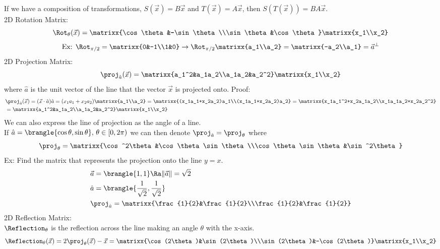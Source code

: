 If we have a composition of transformations, $S(\vec{x})=B\vec{x}$ and $T(\vec{x})=A\vec{x}$, then $S(T(\vec{x}))=BA\vec{x}$.\\
2D Rotation Matrix:
$$\Rot_{\theta}(\vec{x})=\matrixx{\cos\theta&-\sin\theta\\\sin\theta&\cos\theta}\matrixx{x_1\\x_2}\\$$
\begin{align*}
    \text{Ex: }\Rot_{\pi/2}=\matrixx{0&-1\\1&0}\to\Rot_{\pi/2}\matrixx{a_1\\a_2}=\matrixx{-a_2\\a_1}=\vec{a}^\perp
\end{align*}
2D Projection Matrix:
$$\proj_{\hat{a}}(\vec{x})=\matrixx{a_1^2&a_1a_2\\a_1a_2&a_2^2}\matrixx{x_1\\x_2}$$
where $\hat{a}$ is the unit vector of the line that the vector $\vec{x}$ is projected onto.
Proof:
\begin{align*}
    &\proj_{\hat{a}}(\vec{x})=(\vec{x}\cdot\hat{a})\hat{a}=(x_1a_1+x_2a_2)\matrixx{a_1\\a_2}=\matrixx{(x_1a_1+x_2a_2)a_1\\(x_1a_1+x_2a_2)a_2}=\matrixx{x_1a_1^2+x_2a_1a_2\\x_1a_1a_2+x_2a_2^2}\\
    &=\matrixx{a_1^2&a_1a_2\\a_1a_2&a_2^2}\matrixx{x_1\\x_2}
\end{align*}
We can also express the line of projection as the angle of a line.\\
If $\hat{a}=\brangle{\cos\theta,\sin\theta},\,\theta\in[0,2\pi)$ we can then denote $\proj_{\hat{a}}=\proj_\theta$ where
$$\proj_\theta=\matrixx{\cos^2\theta&\cos\theta\sin\theta\\\cos\theta\sin\theta&\sin^2\theta}$$
Ex: Find the matrix that represents the projection onto the line $y=x$.
\begin{align*}
    &\vec{a}=\brangle{1,1}\Ra \|\vec{a}\|=\sqrt{2}\\
    &\hat{a}=\brangle{\frac{1}{\sqrt{2}},\frac{1}{\sqrt{2}}}\\
    &\proj_{\hat{a}}=\matrixx{\frac{1}{2}&\frac{1}{2}\\\frac{1}{2}&\frac{1}{2}}
\end{align*}
2D Reflection Matrix:\\
$\Reflection_{\theta}$ is the reflection across the line making an angle $\theta$ with the x-axis.
$$\Reflection_\theta(\vec{x})=2\proj_{\theta}(\vec{x})-\vec{x}=\matrixx{\cos(2\theta)&\sin(2\theta)\\\sin(2\theta)&-\cos(2\theta)}\matrixx{x_1\\x_2}$$
